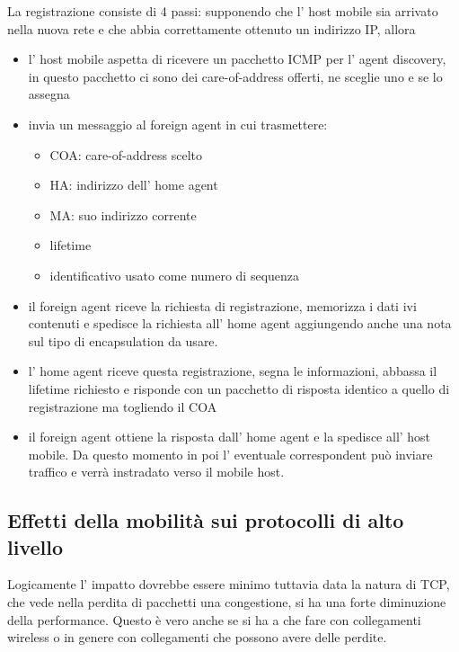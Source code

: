 La registrazione consiste di 4 passi: supponendo che l' host mobile sia arrivato nella nuova rete e che abbia correttamente ottenuto un indirizzo IP, allora
\begin{itemize}
    \item l' host mobile aspetta di ricevere un pacchetto ICMP per l' agent discovery, in questo pacchetto ci sono dei care-of-address offerti, ne sceglie uno e se lo assegna

    \item invia un messaggio al foreign agent in cui trasmettere:
    \begin{itemize}
        \item COA: care-of-address scelto
        \item HA: indirizzo dell' home agent
        \item MA: suo indirizzo corrente
        \item lifetime
        \item identificativo usato come numero di sequenza
    \end{itemize}
    
    \item il foreign agent riceve la richiesta di registrazione, memorizza i dati ivi contenuti e spedisce la richiesta all' home agent aggiungendo anche una nota sul tipo di encapsulation da usare.
    
    \item l' home agent riceve questa registrazione, segna le informazioni, abbassa il lifetime richiesto e risponde con un pacchetto di risposta identico a quello di registrazione ma togliendo il COA
    
    \item il foreign agent ottiene la risposta dall' home agent e la spedisce all' host mobile. Da questo momento in poi l' eventuale correspondent può inviare traffico e verrà instradato verso il mobile host.
\end{itemize}

\subsection{Effetti della mobilità sui protocolli di alto livello}
Logicamente l' impatto dovrebbe essere minimo tuttavia data la natura di TCP, che vede nella perdita di pacchetti una congestione, si ha una forte diminuzione della performance.
Questo è vero anche se si ha a che fare con collegamenti wireless o in genere con collegamenti che possono avere delle perdite.


